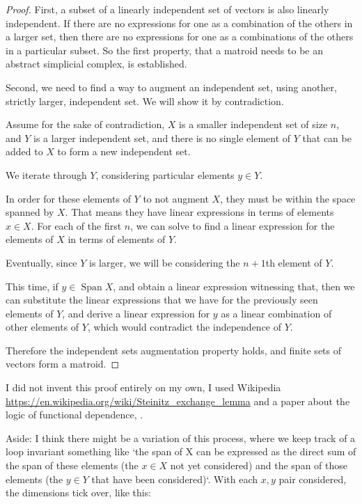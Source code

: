 \documentclass[11pt, noamsfonts]{amsart}
\DeclareMathOperator{\Span}{Span}
\begin{document}
\begin{proof}
First, a subset of a linearly independent set of vectors is also linearly independent. If there are no expressions for one as a combination of the others in a larger set, then there are no expressions for one as a combinations of the others in a particular subset. So the first property, that a matroid needs to be an abstract simplicial complex, is established.

Second, we need to find a way to augment an independent set,
using another, strictly larger, independent set. We will show it by contradiction.

Assume for the sake of contradiction,
\(X\) is a smaller independent set of size \(n\),
and \(Y\) is a larger independent set,
and there is no single element of \(Y\)
that can be added to \(X\) to form a new independent set.

We iterate through  \(Y\), considering
particular elements \(y \in Y\).

In order for these elements of \(Y\) to not augment \(X\), they must be within the space spanned by \(X\). That means they have linear expressions in terms of elements \(x \in X\). For each of the first \(n\), we can solve to find a linear expression for the elements of \(X\) in terms of elements of \(Y\).

Eventually, since \(Y\) is larger, we will be considering the \(n+1\)th element of \(Y\). 

This time, if \(y \in \Span X\), and obtain a linear expression witnessing that, then we can substitute the linear expressions that we have for the previously seen elements of \(Y\),
and derive a linear expression for \(y\) as a linear combination of
other elements of \(Y\), which would contradict the independence of \(Y\).

Therefore the independent sets augmentation property holds, and finite sets of vectors form a matroid.
\end{proof}

I did not invent this proof entirely on my own, I used Wikipedia \url{https://en.wikipedia.org/wiki/Steinitz_exchange_lemma}
and a paper about the logic of functional dependence, \cite{baltag2021simple}.

Aside: I think there might be a variation of this process,
where we keep track of a loop invariant something like `the span
of X can be expressed as the direct sum of the span of these elements (the \(x \in X\) not yet considered) and the span of those elements (the \(y \in Y\) that have been considered)`. With each \(x, y\) pair considered, the dimensions tick over, like this:
\end{document}
